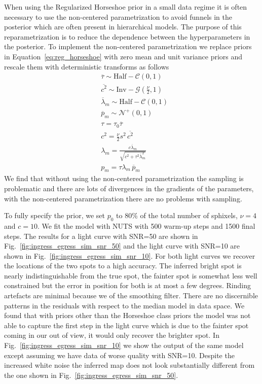 \documentclass[modern]{aastex62}
\begin{document}
When using the Regularized Horseshoe prior in a small data regime it is often necessary to use the non-centered parametrization to avoid funnels in the posterior which are often present in hierarchical models.
The purpose of this reparametrization is to reduce the dependence between the hyperparameters in the posterior.
To implement the non-centered parametrization we replace priors in Equation~\ref{eq:reg_horseshoe} with zero mean and unit variance priors and rescale them with deterministic transforms as follows
\begin{equation}
\begin{aligned}
    &\overline{\tau} \sim \mathrm{Half}-\mathcal{C}\left(0, 1\right)\\
    &\overline{c^{2}}  \sim \mathrm{Inv}-\mathcal{G}\left(\frac{\nu}{2}, 1\right) \\
    &\overline{\lambda}_{m}  \sim \mathrm{Half}-\mathcal{C}(0,1) \\
    &\overline{p}_{m}  \sim \mathcal{N}^+\left(0, 1\right)\\
    &\tau=\tau_0\overline{\tau}\\
    &c^2=\frac{\nu}{2}s^2\,\overline{c^2}\\
    &\lambda_{m} =\frac{c \overline{\lambda}_{m}}{\sqrt{c^{2}+\tau^{2} \overline{\lambda}_{m}^{2}}} \\
    &p_m = \tau\lambda_m\,\overline{p}_m
\end{aligned}
    \label{eq:reg_horseshoe_noncentered}
\end{equation}
We find that without using the non-centered parametrization the sampling is problematic and there are lots of divergences in the gradients of the parameters, with the non-centered parametrization there are no problems with sampling.

To fully specify the prior, we set $p_0$ to 80\% of the total number of sphixels, $\nu=4$ and $c=10$. 
We fit the model with NUTS with 500 warm-up steps and 1500 final steps. 
The results for a light curve with SNR=50 are shown in Fig.~\ref{fig:ingress_egress_sim_snr_50} and the light curve with SNR=10 are shown in Fig.~\ref{fig:ingress_egress_sim_snr_10}.
For both light curves we recover the locations of the two spots to a high accuracy. 
The inferred bright spot is nearly indistinguishable from the true spot, the fainter spot is somewhat less well constrained but the error in position for both is at most a few degrees.
Rinding artefacts are minimal because we of the smoothing filter.
There are no discernible patterns in the residuals with respect to the median model in data space. 
We found that with priors other than the Horseshoe class priors the model was not able to capture the first step in the light curve which is due to the fainter spot coming in our out of view, it would only recover the brighter spot.
In Fig.~\ref{fig:ingress_egress_sim_snr_10} we show the output of the same model except assuming we have data of worse quality with SNR=10. 
Despite the increased white noise the inferred map does not look substantially different from the one shown in Fig.~\ref{fig:ingress_egress_sim_snr_50}.
\end{document}
